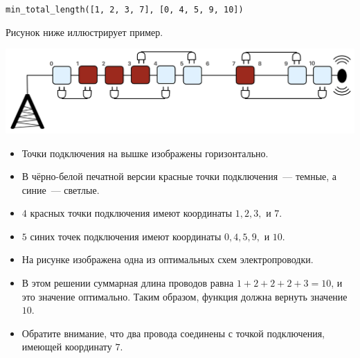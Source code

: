 \texttt{min\_total\_length([1, 2, 3, 7], [0, 4, 5, 9, 10])}

Рисунок ниже иллюстрирует пример.

\includegraphics[scale=0.5]{wiring.png}

\begin{itemize}
\item Точки подключения на вышке изображены горизонтально.
\item В чёрно-белой печатной версии красные точки подключения~--- темные, а синие~--- светлые.
\item $4$ красных точки подключения имеют координаты $1, 2, 3,$ и $7$.
\item $5$ синих точек подключения имеют координаты $0, 4, 5, 9,$ и $10$.
\item На рисунке изображена одна из оптимальных схем электропроводки.
\item В этом решении суммарная длина проводов равна $1 + 2 + 2 + 2 + 3 = 10$, и это
значение оптимально. Таким образом, функция должна вернуть значение $10$.
\item Обратите внимание, что два провода соединены с точкой подключения, имеющей
координату $7$.
\end{itemize}